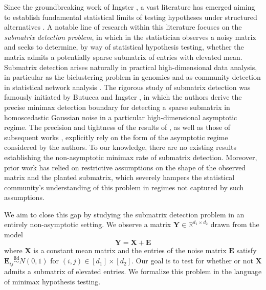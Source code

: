 \documentclass{article}
\newcommand{\R}{\mathbb{R}}
\newcommand{\X}{\mathbf{X}}
\newcommand{\Y}{\mathbf{Y}}
\newcommand{\E}{\mathbf{E}}
\newcommand{\iid}{\overset{\textrm{iid}}{\sim}}
\theoremstyle{remark}
\begin{document}
Since the groundbreaking work of Ingster \citep{ingster1982minimax, ingster1987minimax,ingster1996some, ingster1998minimax, ingster2012nonparametric}, a vast literature has emerged aiming to establish fundamental statistical limits of testing hypotheses under structured alternatives \citep{baraud2002non, arias2008searching, arias2011global,arias2014community, verzelen2015community, collier2017minimax, ingster2010detection, berthet2013optimal, perry2018optimality, liu2021minimax}. A notable line of research within this literature focuses on the \textit{submatrix detection problem}, in which in the statistician observes a noisy matrix and seeks to determine, by way of statistical hypothesis testing, whether the matrix admits a potentially sparse submatrix of entries with elevated mean. Submatrix detection arises naturally in practical high-dimensional data analysis, in particular as the biclustering problem in genomics \citep{cheng2000biclustering, shabalin2009finding, xie2019time, balakrishnan2011statistical} and as community detection in statistical network analysis \citep{dey2022community, arias2014community, fortunato202220}. The rigorous study of submatrix detection was famously initiated by Butucea and Ingster \citep{butucea2013detection}, in which the authors derive the precise minimax detection boundary for detecting a sparse submatrix in homoscedastic Gaussian noise in a particular high-dimensional asymptotic regime. The precision and tightness of the results of \citet{butucea2013detection}, as well as those of subsequent works \citep{arias2014community, verzelen2015community, dadon2024detection, luo2022tensor}, explicitly rely on the form of the asymptotic regime considered by the authors. To our knowledge, there are no existing results establishing the non-asymptotic minimax rate of submatrix detection. 
Moreover, prior work has relied on restrictive assumptions on the shape of the observed matrix and the planted submatrix, which severely hampers the statistical community's understanding of this problem in regimes not captured by such assumptions.

We aim to close this gap by studying the submatrix detection problem in an entirely non-asymptotic setting. We observe a matrix $\Y \in \R^{d_1\times d_2}$ drawn from the model
\begin{equation}\label{eq_model}
    \Y = \X  +\E
\end{equation}
where $\X$ is a constant mean matrix and the entries of the noise matrix $\E$ satisfy $\E_{ij}\iid N(0,1)$ for $(i,j) \in [d_1] \times [d_2]$. Our goal is to test for whether or not $\X$ admits a submatrix of elevated entries. We formalize this problem in the language of minimax hypothesis testing.
\end{document}
